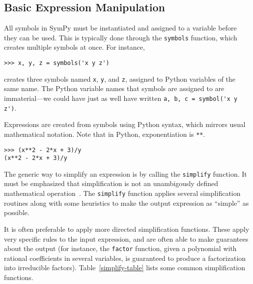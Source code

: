 
\subsection{Basic Expression Manipulation}


All symbols in SymPy must be instantiated and assigned to a variable before
they can be used. This is typically done through the \texttt{symbols}
function, which creates multiple symbols at once. For instance,

\begin{verbatim}
>>> x, y, z = symbols('x y z')
\end{verbatim}

creates three symbols named \texttt{x}, \texttt{y}, and \texttt{z}, assigned
to Python variables of the same name. The Python variable names that symbols
are assigned to are immaterial---we could have just as well have written
\verb|a, b, c = symbol('x y z')|.

Expressions are created from symbols using Python syntax, which mirrors usual
mathematical notation. Note that in Python, exponentiation is \verb|**|.

\begin{verbatim}
>>> (x**2 - 2*x + 3)/y
(x**2 - 2*x + 3)/y
\end{verbatim}





The generic way to simplify an expression is by calling the \texttt{simplify}
function.
It must be emphasized that simplification is not an unambigously defined
mathematical operation~\cite{Carette2004understanding}.
The \texttt{simplify} function applies several simplification routines along
with some heuristics to make the output expression as ``simple'' as possible.

It is often preferable to apply more directed simplification functions. These
apply very specific rules to the input expression, and are often able to make
guarantees about the output (for instance, the \texttt{factor} function, given
a polynomial with rational coefficients in several variables, is guaranteed to
produce a factorization into irreducible factors).
Table~\ref{simplify-table} lists some common simplification functions.

